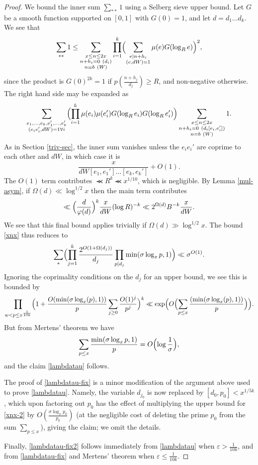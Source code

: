 \documentclass{bmcart}
\theoremstyle{plain}
\theoremstyle{definition}
\newcommand\eps{\varepsilon}
\renewcommand{\lessapprox}{\llcurly}
\renewcommand{\phi}{\varphi}
\begin{document}
\begin{proof}
We bound the inner sum $\sum_{**} 1$  using a Selberg sieve upper bound. Let $G$ be a smooth  function supported on $[0,1]$ with $G(0)=1$, and let $d=d_1\dots d_k$. We see that
$$\sum_{**} 1\le \sum_{\substack{x\le n\le 2x\\ n+h_i = 0\ (d_i) \\ n\equiv b\ (W)}}\prod_{i=1}^k\Bigl(\sum_{\substack{e|n+h_i\\ (e,dW)=1}}\mu(e)G(\log_R{e})\Bigr)^2,$$
since the product is $G(0)^{2k}=1$ if $p( \frac{n+h_j}{d_j}) \geq R$, and non-negative otherwise. The right hand side may be expanded as
$$ \sum_{\substack{e_1,\dots,e_k,e_1',\dots,e_k'\\ (e_ie_i',dW)=1\forall i}}\Bigl(\prod_{i=1}^k\mu(e_i)\mu(e_i')G(\log_R{e_i})G(\log_R{e_i'})\Bigr)\sum_{\substack{x\le n\le 2x \\ n+h_i = 0\ (d_i[e_i,e_i']) \\ n= b\ (W)}}1.$$
As in Section \ref{triv-sec}, the inner sum vanishes unless the $e_ie_i'$ are coprime to each other and $dW$, in which case it is
$$\frac{x}{dW[e_1,e_1']\dots [e_k,e_k']}+O(1).$$
The $O(1)$ term contributes $\lessapprox R^k\lessapprox x^{1/10}$, which is negligible. By Lemma \ref{mul-asym}, if $\Omega(d)\ll \log^{1/2}{x}$ then the main term contributes
$$\ll \Bigl(\frac{d}{\phi(d)}\Bigr)^k\frac{x}{d W}(\log{R})^{-k}\ll 2^{\Omega(d)}B^{-k}\frac{x}{d W}.$$
We see that this final bound applies trivially if $\Omega(d)\gg \log^{1/2}{x}$. The bound \eqref{xnx} thus reduces to
\begin{equation}\label{xnx-2}
\sum_* \Bigl(\prod_{j=1}^k \frac{2^{O(1+\Omega(d_j))}}{d_j} \prod_{p|d_j} \min( \sigma \log_x p, 1 )\Bigr) \ll \sigma^{O(1)}.
\end{equation}
Ignoring the coprimality conditions on the $d_j$ for an upper bound, we see this is bounded by
$$ \prod_{w<p\le x^{\frac{1}{10k}}}\Bigl(1+\frac{O(\min(\sigma\log_x(p),1))}{p}\sum_{j\ge 0}\frac{O(1)^j}{p^j}\Bigr)^k \ll \exp\Bigl(O\Bigl(\sum_{p\le x}\frac{(\min(\sigma\log_x(p),1))}{p}\Bigr)\Bigr).$$
But from Mertens' theorem we have
$$ \sum_{p \leq x} \frac{\min(\sigma \log_x p, 1)}{p} = O\Bigl( \log \frac{1}{\sigma} \Bigr),$$
and the claim \eqref{lambdatau} follows.

The proof of \eqref{lambdatau-fix} is a minor modification of the argument above used to prove \eqref{lambdatau}.  
Namely, the variable $d_{j_0}$ is now replaced by $[d_0,p_0]<x^{1/5k}$, which upon factoring out $p_0$ has the effect of multiplying the upper bound for \eqref{xnx-2} by $O( \frac{\sigma \log_x p_0}{p_0})$ (at the negligible cost of deleting the prime $p_0$ from the sum $\sum_{p \leq x}$), giving the claim; we omit the details.

Finally, \eqref{lambdatau-fix2} follows immediately from \eqref{lambdatau} when $\eps > \frac{1}{10k}$, and from \eqref{lambdatau-fix} and Mertens' theorem when $\eps \leq \frac{1}{10k}$.
\end{proof}
\end{document}
